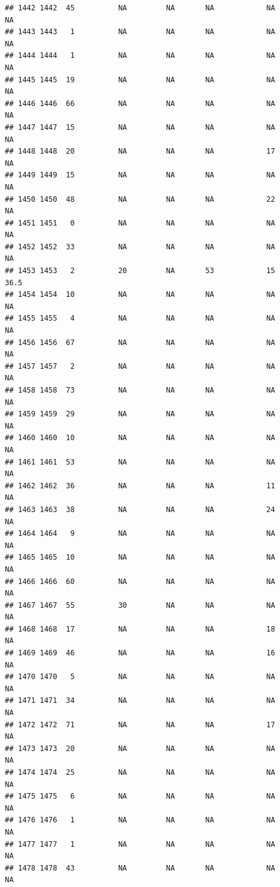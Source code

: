 \documentclass[man]{apa6}
\begin{document}
\begin{verbatim}
## 1442 1442  45          NA         NA       NA            NA       NA
## 1443 1443   1          NA         NA       NA            NA       NA
## 1444 1444   1          NA         NA       NA            NA       NA
## 1445 1445  19          NA         NA       NA            NA       NA
## 1446 1446  66          NA         NA       NA            NA       NA
## 1447 1447  15          NA         NA       NA            NA       NA
## 1448 1448  20          NA         NA       NA            17       NA
## 1449 1449  15          NA         NA       NA            NA       NA
## 1450 1450  48          NA         NA       NA            22       NA
## 1451 1451   0          NA         NA       NA            NA       NA
## 1452 1452  33          NA         NA       NA            NA       NA
## 1453 1453   2          20         NA       53            15     36.5
## 1454 1454  10          NA         NA       NA            NA       NA
## 1455 1455   4          NA         NA       NA            NA       NA
## 1456 1456  67          NA         NA       NA            NA       NA
## 1457 1457   2          NA         NA       NA            NA       NA
## 1458 1458  73          NA         NA       NA            NA       NA
## 1459 1459  29          NA         NA       NA            NA       NA
## 1460 1460  10          NA         NA       NA            NA       NA
## 1461 1461  53          NA         NA       NA            NA       NA
## 1462 1462  36          NA         NA       NA            11       NA
## 1463 1463  38          NA         NA       NA            24       NA
## 1464 1464   9          NA         NA       NA            NA       NA
## 1465 1465  10          NA         NA       NA            NA       NA
## 1466 1466  60          NA         NA       NA            NA       NA
## 1467 1467  55          30         NA       NA            NA       NA
## 1468 1468  17          NA         NA       NA            18       NA
## 1469 1469  46          NA         NA       NA            16       NA
## 1470 1470   5          NA         NA       NA            NA       NA
## 1471 1471  34          NA         NA       NA            NA       NA
## 1472 1472  71          NA         NA       NA            17       NA
## 1473 1473  20          NA         NA       NA            NA       NA
## 1474 1474  25          NA         NA       NA            NA       NA
## 1475 1475   6          NA         NA       NA            NA       NA
## 1476 1476   1          NA         NA       NA            NA       NA
## 1477 1477   1          NA         NA       NA            NA       NA
## 1478 1478  43          NA         NA       NA            NA       NA

\end{verbatim}
\end{document}
